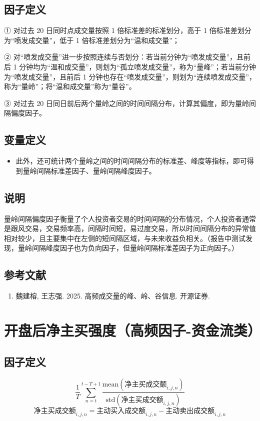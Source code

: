 \documentclass{article}
\begin{document}
\subsection{因子定义}


① 对过去 20 日同时点成交量按照 1 倍标准差的标准划分，高于 1 倍标准差划分为“喷发成交量”，低于 1 倍标准差划分为“温和成交量”；

② 对“喷发成交量”进一步按照连续与否划分：若当前分钟为“喷发成交量”，且前后 1 分钟均为“温和成交量”，则划为“孤立喷发成交量”，称为“量峰”；若当前分钟为“喷发成交量”，且前后 1 分钟也存在“喷发成交量”，则划为“连续喷发成交量”，称为“量岭”；将“温和成交量”称为“量谷”。

③ 对过去 20 日同日前后两个量岭之间的时间间隔分布，计算其偏度，即为量岭间隔偏度因子。

\subsection{变量定义}
\begin{itemize}
    \item 此外，还可统计两个量岭之间的时间间隔分布的标准差、峰度等指标，即可得到量岭间隔标准差因子、量岭间隔峰度因子。
\end{itemize}

\subsection{说明}
量岭间隔偏度因子衡量了个人投资者交易的时间间隔的分布情况，个人投资者通常是跟风交易，交易频率高，间隔时间短，易过度交易，所以时间间隔分布的异常值相对较少，且主要集中在左侧的短间隔区域，与未来收益负相关。（报告中测试发现，量岭间隔峰度因子也为负向因子，但量岭间隔标准差因子为正向因子。）

\subsection{参考文献}
\begin{enumerate}
    \item 魏建榕, 王志强. 2025. 高频成交量的峰、岭、谷信息. 开源证券.
\end{enumerate}

\section{开盘后净主买强度（高频因子-资金流类）}

\subsection{因子定义}
\begin{equation}
    \frac{1}{T} \sum_{n=t}^{t-T+1} \frac{\mathrm{mean}(\text{净主买成交额}_{i,j,n})}{\mathrm{std}(\text{净主买成交额}_{i,j,n})}
\end{equation}
\begin{equation}
    \text{净主买成交额}_{i,j,n} = \text{主动买入成交额}_{i,j,n} - \text{主动卖出成交额}_{i,j,n}
\end{equation}
\end{document}
